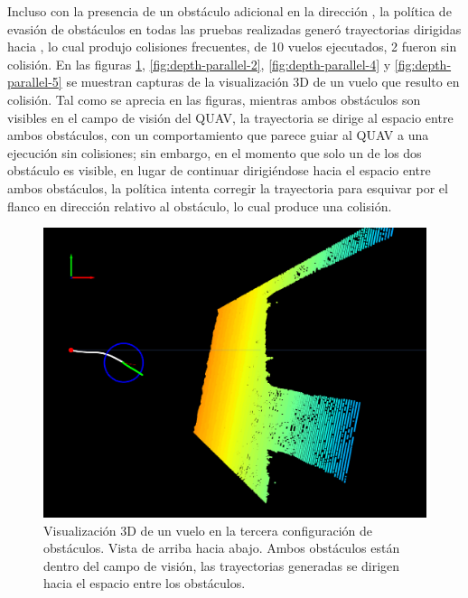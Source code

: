 Incluso con la presencia de un obstáculo adicional en la dirección , la política de evasión de obstáculos en todas las pruebas realizadas generó trayectorias dirigidas hacia , lo cual produjo colisiones frecuentes, de 10 vuelos ejecutados, 2 fueron sin colisión. En las figuras \ref{fig:depth-parallel-1}, \ref{fig:depth-parallel-2},  \ref{fig:depth-parallel-4} y \ref{fig:depth-parallel-5} se muestran capturas de la visualización 3D de un vuelo que resulto en colisión. Tal como se aprecia en las figuras, mientras ambos obstáculos son visibles en el campo de visión del QUAV, la trayectoria se dirige al espacio entre ambos obstáculos, con un comportamiento que parece guiar al QUAV a una ejecución sin colisiones; sin embargo, en el momento que solo un de los dos obstáculo es visible, en lugar de continuar dirigiéndose hacia el espacio entre ambos obstáculos, la política intenta corregir la trayectoria para esquivar por el flanco en dirección  relativo al obstáculo, lo cual produce una colisión. 

\begin{figure}[H]
    \centering
    \includegraphics[scale=0.3]{partes/ImgJoao/depth-parallel-1-topdown.png}
    \caption[Visualización 3D de un vuelo en la tercera configuración de obstáculos. Vista de arriba hacia abajo.]{Visualización 3D de un vuelo en la tercera configuración de obstáculos. Vista de arriba hacia abajo. Ambos obstáculos están dentro del campo de visión, las trayectorias generadas se dirigen hacia el espacio entre los obstáculos.}
    \label{fig:depth-parallel-1}
\end{figure}

